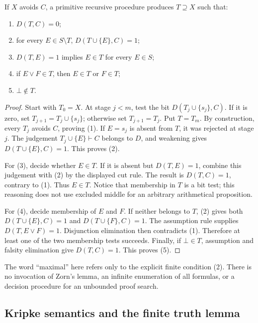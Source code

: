 \begin{lemma}
\label{lem:ipc-prime-extension}
If $X$ avoids $C$, a primitive recursive procedure produces $T\supseteq X$
such that:
\begin{enumerate}
\item $D(T,C)=0$;
\item for every $E\in S\setminus T$, $D(T\cup\{E\},C)=1$;
\item $D(T,E)=1$ implies $E\in T$ for every $E\in S$;
\item if $E\vee F\in T$, then $E\in T$ or $F\in T$;
\item $\bot\notin T$.
\end{enumerate}
\end{lemma}
\begin{proof}
Start with $T_0=X$. At stage $j<m$, test the bit
$D(T_j\cup\{s_j\},C)$. If it is zero, set
$T_{j+1}=T_j\cup\{s_j\}$; otherwise set $T_{j+1}=T_j$. Put $T=T_m$.
By construction, every $T_j$ avoids $C$, proving (1). If $E=s_j$ is absent
from $T$, it was rejected at stage $j$. The judgement
$T_j\cup\{E\}\vdash C$ belongs to $D$, and weakening gives
$D(T\cup\{E\},C)=1$. This proves (2).

For (3), decide whether $E\in T$. If it is absent but $D(T,E)=1$, combine
this judgement with (2) by the displayed cut rule. The result is
$D(T,C)=1$, contrary to (1). Thus $E\in T$. Notice that membership in $T$
is a bit test; this reasoning does not use excluded middle for an arbitrary
arithmetical proposition.

For (4), decide membership of $E$ and $F$. If neither belongs to $T$, (2)
gives both $D(T\cup\{E\},C)=1$ and $D(T\cup\{F\},C)=1$. The assumption
rule supplies $D(T,E\vee F)=1$. Disjunction elimination then contradicts
(1). Therefore at least one of the two membership tests succeeds.
Finally, if $\bot\in T$, assumption and falsity elimination give
$D(T,C)=1$. This proves (5).
\end{proof}

The word ``maximal'' here refers only to the explicit finite condition (2).
There is no invocation of Zorn's lemma, an infinite enumeration of all
formulas, or a decision procedure for an unbounded proof search.

\subsection{Kripke semantics and the finite truth lemma}

